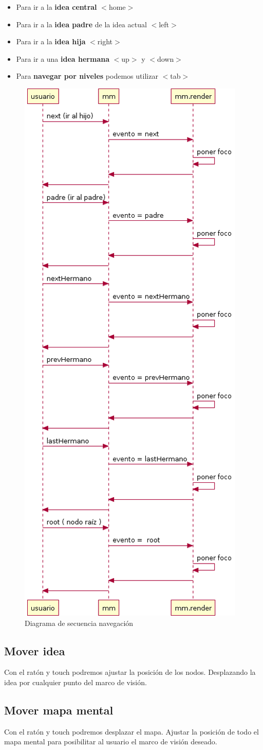 \begin{itemize}
\item Para ir a la \textbf{idea central} $<$home$>$
\item Para ir a la \textbf{idea padre} de la idea actual $<$left$>$
\item Para ir a la \textbf{idea hija} $<$right$>$
\item Para ir a una \textbf{idea hermana} $<$up$>$ y $<$down$>$
\item Para \textbf{navegar por niveles} podemos utilizar $<$tab$>$
\end{itemize}

\begin{figure}[tbph]
\centering
\includegraphics[width=0.4\linewidth]{imagenes/diagrama-seq-navegacion}
\caption{Diagrama de secuencia navegación}
\label{fig:diagrama-seq-navegacion}
\end{figure}


\subsection{Mover idea}
Con el ratón y touch podremos ajustar la posición de los nodos. Desplazando la idea por cualquier punto del marco de visión. 

\subsection{Mover mapa mental}
Con el ratón y touch podremos desplazar el mapa. Ajustar la posición de todo el mapa mental para posibilitar al usuario el marco de visión deseado. 

